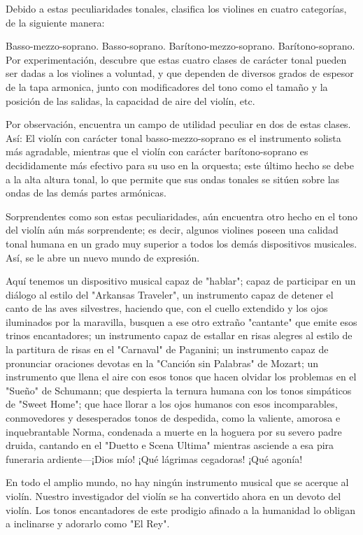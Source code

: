 \documentclass[12pt]{book}
\begin{document}
Debido a estas peculiaridades tonales, clasifica los violines en cuatro categorías, de la siguiente manera:

Basso-mezzo-soprano.
Basso-soprano.
Barítono-mezzo-soprano.
Barítono-soprano.
Por experimentación, descubre que estas cuatro clases de carácter tonal pueden ser dadas a los violines a voluntad, y que dependen de diversos grados de espesor de la tapa armonica, junto con modificadores del tono como el tamaño y la posición de las salidas, la capacidad de aire del violín, etc.

Por observación, encuentra un campo de utilidad peculiar en dos de estas clases. Así: El violín con carácter tonal basso-mezzo-soprano es el instrumento solista más agradable, mientras que el violín con carácter barítono-soprano es decididamente más efectivo para su uso en la orquesta; este último hecho se debe a la alta altura tonal, lo que permite que sus ondas tonales se sitúen sobre las ondas de las demás partes armónicas.

Sorprendentes como son estas peculiaridades, aún encuentra otro hecho en el tono del violín aún más sorprendente; es decir, algunos violines poseen una calidad tonal humana en un grado muy superior a todos los demás dispositivos musicales. Así, se le abre un nuevo mundo de expresión.

Aquí tenemos un dispositivo musical capaz de "hablar"; capaz de participar en un diálogo al estilo del "Arkansas Traveler", un instrumento capaz de detener el canto de las aves silvestres, haciendo que, con el cuello extendido y los ojos iluminados por la maravilla, busquen a ese otro extraño "cantante" que emite esos trinos encantadores; un instrumento capaz de estallar en risas alegres al estilo de la partitura de risas en el "Carnaval" de Paganini; un instrumento capaz de pronunciar oraciones devotas en la "Canción sin Palabras" de Mozart; un instrumento que llena el aire con esos tonos que hacen olvidar los problemas en el "Sueño" de Schumann; que despierta la ternura humana con los tonos simpáticos de "Sweet Home"; que hace llorar a los ojos humanos con esos incomparables, conmovedores y desesperados tonos de despedida, como la valiente, amorosa e inquebrantable Norma, condenada a muerte en la hoguera por su severo padre druida, cantando en el "Duetto e Scena Ultima" mientras asciende a esa pira funeraria ardiente—¡Dios mío! ¡Qué lágrimas cegadoras! ¡Qué agonía!

En todo el amplio mundo, no hay ningún instrumento musical que se acerque al violín. Nuestro investigador del violín se ha convertido ahora en un devoto del violín. Los tonos encantadores de este prodigio afinado a la humanidad lo obligan a inclinarse y adorarlo como "El Rey".
\end{document}
